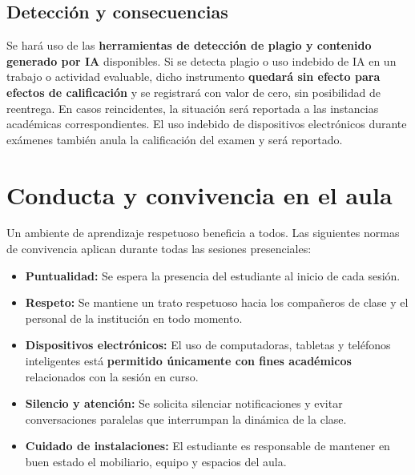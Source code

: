 \documentclass[12pt]{article}
\begin{document}
	\subsection*{Detección y consecuencias}
	
	Se hará uso de las \textbf{herramientas de detección de plagio y contenido generado por IA} disponibles. Si se detecta plagio o uso indebido de IA en un trabajo o actividad evaluable, dicho instrumento \textbf{quedará sin efecto para efectos de calificación} y se registrará con valor de cero, sin posibilidad de reentrega. En casos reincidentes, la situación será reportada a las instancias académicas correspondientes. El uso indebido de dispositivos electrónicos durante exámenes también anula la calificación del examen y será reportado.
	
	\section*{Conducta y convivencia en el aula}
	
	Un ambiente de aprendizaje respetuoso beneficia a todos. Las siguientes normas de convivencia aplican durante todas las sesiones presenciales:
	
	\begin{itemize}
		\item \textbf{Puntualidad:} Se espera la presencia del estudiante al inicio de cada sesión.
		\item \textbf{Respeto:} Se mantiene un trato respetuoso hacia los compañeros de clase y el personal de la institución en todo momento.
		\item \textbf{Dispositivos electrónicos:} El uso de computadoras, tabletas y teléfonos inteligentes está \textbf{permitido únicamente con fines académicos} relacionados con la sesión en curso.
		\item \textbf{Silencio y atención:} Se solicita silenciar notificaciones y evitar conversaciones paralelas que interrumpan la dinámica de la clase.
		\item \textbf{Cuidado de instalaciones:} El estudiante es responsable de mantener en buen estado el mobiliario, equipo y espacios del aula.
	\end{itemize}
	
	
	
\end{document}
